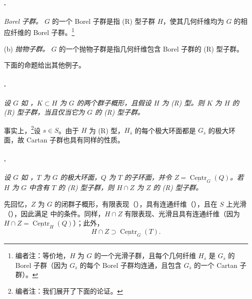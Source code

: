\paragraph{.}
\textup{} \emph{Borel 子群。} \(G\) 的一个 Borel 子群是指 \textup{(R)} 型子群 \(H\)，使其几何纤维均为 \(G\) 的相应纤维的 Borel 子群。\footnote{编者注：等价地，\(H\) 为 \(G\) 的一个光滑子群，且每个几何纤维 \(H_{\bar s}\) 是 \(G_{\bar s}\) 的 Borel 子群（因为 \(G_{\bar s}\) 的每个 Borel 子群均连通，且包含 \(G_{\bar s}\) 的一个 Cartan 子群）。}

\textup{(b)} \emph{抛物子群。} \(G\) 的一个抛物子群是指几何纤维包含 Borel 子群的 \textup{(R)} 型子群。

下面的命题给出其他例子。

\paragraph{.}
\textit{设 \(G\) 如 ，\(K\subset H\) 为 \(G\) 的两个群子概形，且假设 \(H\) 为 \textup{(R)} 型。则 \(K\) 为 \(H\) 的 \textup{(R)} 型子群，当且仅当它为 \(G\) 的 \textup{(R)} 型子群。}

事实上，\footnote{编者注：我们展开了下面的论证。}设 \(s\in S\)。由于 \(H\) 为 \textup{(R)} 型，\(H_{\bar s}\) 的每个极大环面都是 \(G_{\bar s}\) 的极大环面，故 Cartan 子群也具有同样的性质。

\paragraph{.}
\textit{设 \(G\) 如 ，\(T\) 为 \(G\) 的极大环面，\(Q\) 为 \(T\) 的子环面，并令 \(Z=\underline{\operatorname{Centr}}_G(Q)\)。若 \(H\) 为 \(G\) 中含有 \(T\) 的 \textup{(R)} 型子群，则 \(H\cap Z\) 为 \(Z\) 的 \textup{(R)} 型子群。}

先回忆，\(Z\) 为 \(G\) 的闭群子概形，有限表现（），具有连通纤维（），且在 \(S\) 上光滑（），因此满足 中的条件。同样，\(H\cap Z\) 有限表现、光滑且具有连通纤维（因为 \(H\cap Z=\underline{\operatorname{Centr}}_H(Q)\)）；此外，
\[
  H\cap Z\supset\underline{\operatorname{Centr}}_G(T).
\]

